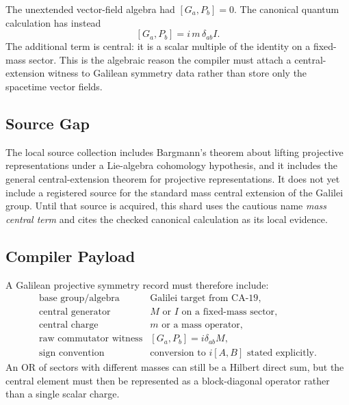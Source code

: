 The unextended vector-field algebra had \([G_a,P_b]=0\).  The canonical quantum
calculation has instead
\[
  [G_a,P_b]=i\,m\,\delta_{ab}I.
\]
The additional term is central: it is a scalar multiple of the identity on a
fixed-mass sector.  This is the algebraic reason the compiler must attach a
central-extension witness to Galilean symmetry data rather than store only the
spacetime vector fields.

\subsection{Source Gap}

The local source collection includes Bargmann's theorem about lifting projective
representations under a Lie-algebra cohomology hypothesis, and it includes the
general central-extension theorem for projective representations.  It does not
yet include a registered source for the standard mass central extension of the
Galilei group.  Until that source is acquired, this shard uses the cautious name
\emph{mass central term} and cites the checked canonical calculation as its
local evidence.

\subsection{Compiler Payload}

A Galilean projective symmetry record must therefore include:
\[
\begin{array}{ll}
\text{base group/algebra} & \text{Galilei target from CA-19},\\
\text{central generator} & M\text{ or }I\text{ on a fixed-mass sector},\\
\text{central charge} & m\text{ or a mass operator},\\
\text{raw commutator witness} & [G_a,P_b]=i\delta_{ab}M,\\
\text{sign convention} & \text{conversion to }i[A,B]\text{ stated explicitly}.
\end{array}
\]
An OR of sectors with different masses can still be a Hilbert direct sum, but
the central element must then be represented as a block-diagonal operator rather
than a single scalar charge.
